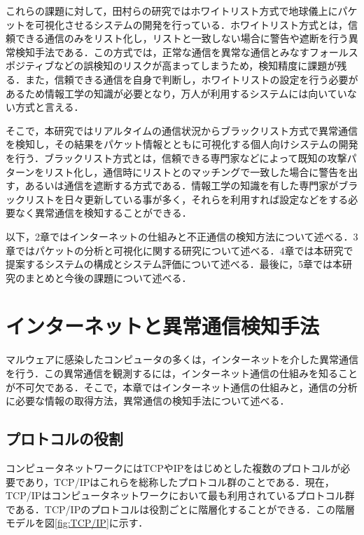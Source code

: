 \documentclass{thesis}
\begin{document}
これらの課題に対して，田村らの研究ではホワイトリスト方式で地球儀上にパケットを可視化させるシステムの開発を行っている\cite{tamura}．ホワイトリスト方式とは，信頼できる通信のみをリスト化し，リストと一致しない場合に警告や遮断を行う異常検知手法である．この方式では，正常な通信を異常な通信とみなすフォールスポジティブなどの誤検知のリスクが高まってしまうため，検知精度に課題が残る．また，信頼できる通信を自身で判断し，ホワイトリストの設定を行う必要があるため情報工学の知識が必要となり，万人が利用するシステムには向いていない方式と言える．

そこで，本研究ではリアルタイムの通信状況からブラックリスト方式で異常通信を検知し，その結果をパケット情報とともに可視化する個人向けシステムの開発を行う．ブラックリスト方式とは，信頼できる専門家などによって既知の攻撃パターンをリスト化し，通信時にリストとのマッチングで一致した場合に警告を出す，あるいは通信を遮断する方式である．情報工学の知識を有した専門家がブラックリストを日々更新している事が多く，それらを利用すれば設定などをする必要なく異常通信を検知することができる．

以下，2章ではインターネットの仕組みと不正通信の検知方法について述べる．3章ではパケットの分析と可視化に関する研究について述べる．4章では本研究で提案するシステムの構成とシステム評価について述べる．最後に，5章では本研究のまとめと今後の課題について述べる．

\chapter{インターネットと異常通信検知手法}

\indent マルウェアに感染したコンピュータの多くは，インターネットを介した異常通信を行う．この異常通信を観測するには，インターネット通信の仕組みを知ることが不可欠である．そこで，本章ではインターネット通信の仕組みと，通信の分析に必要な情報の取得方法，異常通信の検知手法について述べる．

\section{プロトコルの役割}

コンピュータネットワークにはTCPやIPをはじめとした複数のプロトコルが必要であり，TCP/IPはこれらを総称したプロトコル群のことである．現在，TCP/IPはコンピュータネットワークにおいて最も利用されているプロトコル群である．TCP/IPのプロトコルは役割ごとに階層化することができる．この階層モデルを図\ref{fig:TCP/IP}に示す．
\end{document}
